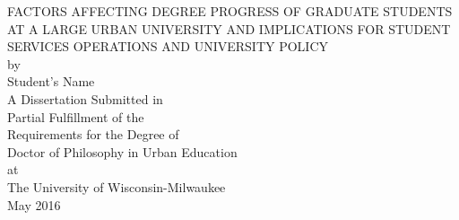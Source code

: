 \doublespacing
\thispagestyle{empty}
\begin{center}
{\LARGE FACTORS AFFECTING DEGREE PROGRESS OF GRADUATE STUDENTS \\ AT A LARGE URBAN UNIVERSITY AND IMPLICATIONS FOR STUDENT \\ SERVICES OPERATIONS AND UNIVERSITY POLICY}\\[1cm]

by \\[2.5cm]
{\Large Student's Name}\\[2.5cm]

{\normalsize A Dissertation Submitted in \\ Partial Fulfillment of the \\ Requirements for the Degree of \\[1cm]
Doctor of Philosophy in Urban Education \\[1cm]
at \\
The University of Wisconsin-Milwaukee \\
May 2016 }
\end{center}
\newpage
